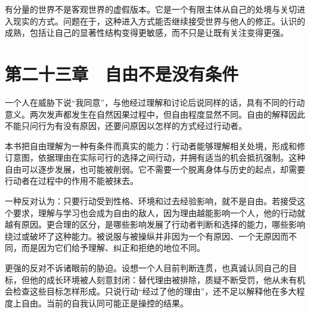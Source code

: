 \documentclass[
  11pt,
  oneside]{book}
\begin{document}
\begingroup{}

有分量的世界不是客观世界的虚假版本。它是一个有限主体从自己的处境与关切进入现实的方式。问题在于，这种进入方式能否继续接受世界与他人的修正。认识的成熟，包括让自己的显著性结构变得更敏感，而不只是让既有关注变得更强。

\par\endgroup

\chapter{第二十三章　自由不是没有条件}\label{ph-ch-23}

一个人在威胁下说``我同意''，与他经过理解和讨论后说同样的话，具有不同的行动意义。两次发声都发生在自然因果过程中，但自由程度显然不同。自由的解释因此不能只问行为有没有原因，还要问原因以怎样的方式经过行动者。

本书把自由理解为一种有条件而真实的能力：行动者能够理解相关处境，形成和修订意图，依据理由在实际可行的选择之间行动，并拥有适当的机会抵抗强制。这种自由可以逐步发展，也可能被削弱。它不需要一个脱离身体与历史的起点，却需要行动者在过程中的作用不能被抹去。

一种反对认为：只要行动受到性格、环境和过去经验影响，就不是自由。若接受这个要求，理解与学习也会成为自由的敌人，因为理由越能影响一个人，他的行动就越有原因。更合理的区分，是哪些影响发展了行动者判断和选择的能力，哪些影响绕过或破坏了这种能力。被说服与被操纵并非因为一个有原因、一个无原因而不同，而是因为它们给予理解、纠正和拒绝的地位不同。

更强的反对不诉诸眼前的胁迫。设想一个人目前判断连贯，也真诚认同自己的目标，但他的成长环境被人刻意封闭：替代理由被排除，质疑不断受罚，他从未有机会检查这些目标怎样形成。只说行动``经过了他的理由''，还不足以解释他在多大程度上自由。当前的自我认同可能正是操控的结果。
\end{document}
